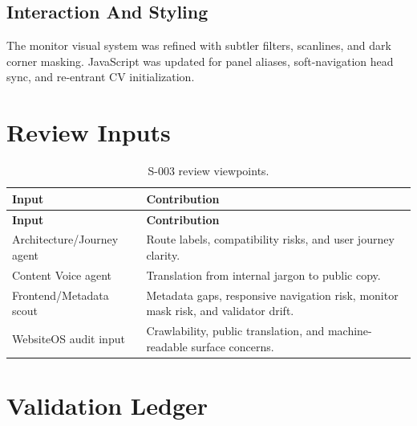 \documentclass[a4paper,11pt,openany]{report}
\begin{document}
\section{Interaction And Styling}

The monitor visual system was refined with subtler filters, scanlines, and dark
corner masking. JavaScript was updated for panel aliases, soft-navigation head
sync, and re-entrant CV initialization.

\chapter{Review Inputs}

\begin{longtable}{p{} p{}}
\caption{S-003 review viewpoints.}\\
\toprule
\textbf{Input} & \textbf{Contribution} \\
\midrule
\endfirsthead
\toprule
\textbf{Input} & \textbf{Contribution} \\
\midrule
\endhead
Architecture/Journey agent & Route labels, compatibility risks, and user journey clarity. \\
Content Voice agent & Translation from internal jargon to public copy. \\
Frontend/Metadata scout & Metadata gaps, responsive navigation risk, monitor mask risk, and validator drift. \\
WebsiteOS audit input & Crawlability, public translation, and machine-readable surface concerns. \\
\bottomrule
\end{longtable}

\chapter{Validation Ledger}
\end{document}
